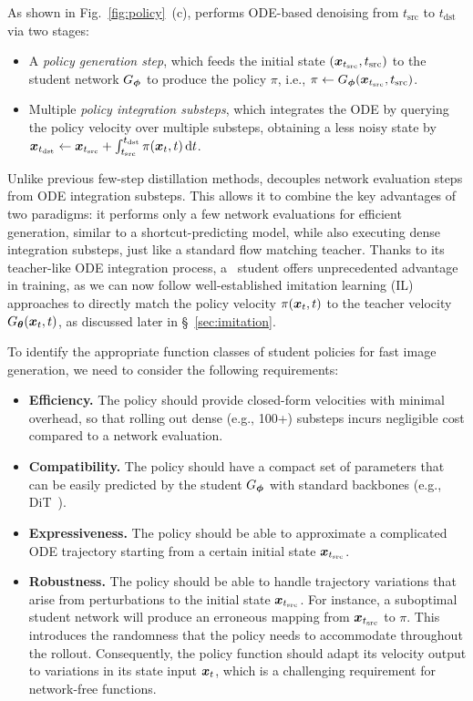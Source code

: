 As shown in Fig.~\ref{fig:policy}~(c), \methodname{} performs ODE-based denoising from $t_\text{src}$ to $t_\text{dst}$ via two stages:
\begin{itemize}
    \item A \emph{policy generation step}, which feeds the initial state $({\bm{x}}_{t_\text{src}}, t_\text{src})$ to the student network $G_{\bm{\phi}}$ to produce the policy $\pi$, i.e., $\pi \gets G_{\bm{\phi}}({\bm{x}}_{t_\text{src}}, t_\text{src})$.
    \item Multiple \emph{policy integration substeps}, which integrates the ODE by querying the policy velocity over multiple substeps, obtaining a less noisy state by ${\bm{x}}_{t_\text{dst}} \gets {\bm{x}}_{t_\text{src}} + \int_{t_\text{src}}^{t_\text{dst}} \pi({\bm{x}}_t,t) \mathop{}\!\mathrm{d} t$.
\end{itemize}
Unlike previous few-step distillation methods, \methodname{} decouples network evaluation steps from ODE integration substeps. This allows it to combine the key advantages of two paradigms: it performs only a few network evaluations for efficient generation, similar to a shortcut-predicting model, while also executing dense integration substeps, just like a standard flow matching teacher.
Thanks to its teacher-like ODE integration process, a \methodname\ student offers unprecedented advantage in training, as we can now follow well-established imitation learning (IL) approaches to directly match the policy velocity $\pi({\bm{x}}_t, t)$ to the teacher velocity $G_{\bm{\theta}}({\bm{x}}_t, t)$, as discussed later in \S~\ref{sec:imitation}.

To identify the appropriate function classes of student policies for fast image generation, we need to consider the following requirements:
\begin{itemize}
    \item \textbf{Efficiency.} The policy should provide closed-form velocities with minimal overhead, so that rolling out dense (e.g., 100+) substeps incurs negligible cost compared to a network evaluation.
    \item \textbf{Compatibility.} The policy should have a compact set of parameters that can be easily predicted by the student $G_{\bm{\phi}}$ with standard backbones (e.g., DiT~\citep{dit}).
    \item \textbf{Expressiveness.} The policy should be able to approximate a complicated ODE trajectory starting from a certain initial state ${\bm{x}}_{t_\text{src}}$.
    \item \textbf{Robustness.} The policy should be able to handle trajectory variations that arise from perturbations to the initial state ${\bm{x}}_{t_\text{src}}$. For instance, a suboptimal student network will produce an erroneous mapping from ${\bm{x}}_{t_\text{src}}$ to $\pi$. This introduces the randomness that the policy needs to accommodate throughout the rollout. Consequently, the policy function should adapt its velocity output to variations in its state input ${\bm{x}}_t$, which is a challenging requirement for network-free functions.
\end{itemize}

